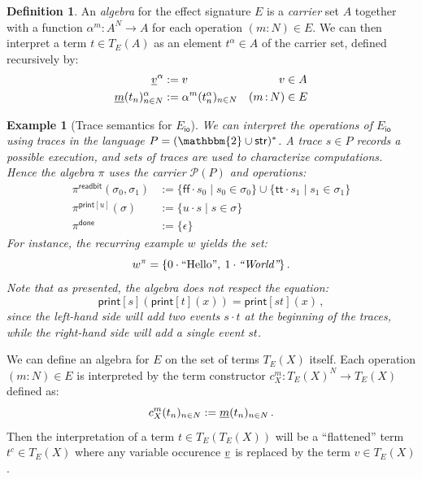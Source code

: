 \documentclass[11pt,oneside,draft]{book}
\newtheorem{example}[theorem]{Example}
\theoremstyle{definition}
\newtheorem{definition}[theorem]{Definition}
\newcommand{\kw}[1]{\ensuremath{ \mathsf{#1} }}
\newcommand{\ul}[1]{%
  \underline{\smash{#1}}
}
\begin{document}
\begin{definition} \label{def:algebra} %
An \emph{algebra}
for the effect signature $E$
is a \emph{carrier} set $A$
together with a function
$\alpha^m : A^N \rightarrow A$
for each operation $(m \mathop{:} N) \in E$.
We can then interpret
a term $t \in T_E(A)$
as an element $t^\alpha \in A$ of the carrier set,
defined recursively by:
\begin{align*}
  \ul{v}^\alpha &:= v & v &\in A \\
  \ul{m}(t_n)_{n \in N}^\alpha &:=
    \alpha^m(t_n^\alpha)_{n \in N} & (m \mathop{:} N) &\in E
\end{align*}
\end{definition}

\begin{example}[Trace semantics for $E_\kw{io}$] %
We can interpret the operations of $E_\kw{io}$ using traces
in the language $P = (\mathbbm{2} \cup \kw{str})^*$.
A trace $s \in P$ records a possible execution,
and sets of traces are used to characterize computations.
Hence the algebra $\pi$ uses the carrier $\mathcal{P}(P)$
and operations:
\begin{align*}
  \pi^\kw{readbit}(\sigma_0, \sigma_1) &:=
    \{ \kw{ff} \cdot s_0 \mid s_0 \in \sigma_0 \} \cup
    \{ \kw{tt} \cdot s_1 \mid s_1 \in \sigma_1 \}
  \\
  \pi^{\kw{print}[u]}(\sigma) &:=
    \{ u \cdot s \mid s \in \sigma \}
  \\
  \pi^{\kw{done}} &:=
    \{ \epsilon \}
\end{align*}
For instance, the recurring example $w$ yields the set:
\[
  w^\pi =
  \{ 0 \cdot \text{\rm ``Hello''}, \: 1 \cdot \text{\em ``World''} \}
  \,.
\]
Note that as presented,
the algebra does not respect the equation:
\[
  \kw{print}[s](\kw{print}[t](x)) = \kw{print}[st](x)
  \,,
\]
since the left-hand side will add two events $s \cdot t$
at the beginning of the traces,
while the right-hand side will add a single event $st$.
\end{example}

We can define an algebra for $E$ on the set of terms $T_E(X)$ itself.
Each operation $(m \mathop: N) \in E$ is interpreted
by the term constructor $c^m_X : T_E(X)^N \rightarrow T_E(X)$
defined as:
\[
  c^m_X(t_n)_{n \in N} := \ul{m}(t_n)_{n \in N}
  \,.
\]
Then the interpretation of a term $t \in T_E(T_E(X))$
will be a ``flattened'' term $t^c \in T_E(X)$ where any
variable occurence $\ul{v}$ is replaced by the term $v \in T_E(X)$.
\end{document}
